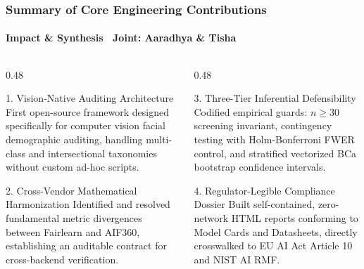 \begin{frame}
  \frametitle{Summary of Core Engineering Contributions}
  \framesubtitle{Impact \& Synthesis \textbar\ Joint: Aaradhya \& Tisha}

  \begin{columns}[T]
    \begin{column}{0.48\textwidth}
      \begin{card}{1. Vision-Native Auditing Architecture}
        \small First open-source framework designed specifically for computer vision facial demographic auditing, handling multi-class and intersectional taxonomies without custom ad-hoc scripts.
      \end{card}

      \vspace{0.15cm}
      \begin{card}{2. Cross-Vendor Mathematical Harmonization}
        \small Identified and resolved fundamental metric divergences between Fairlearn and AIF360, establishing an auditable contract for cross-backend verification.
      \end{card}
    \end{column}

    \begin{column}{0.48\textwidth}
      \begin{card}{3. Three-Tier Inferential Defensibility}
        \small Codified empirical guards: $n \ge 30$ screening invariant, contingency testing with Holm-Bonferroni FWER control, and stratified vectorized BCa bootstrap confidence intervals.
      \end{card}

      \vspace{0.15cm}
      \begin{card}{4. Regulator-Legible Compliance Dossier}
        \small Built self-contained, zero-network HTML reports conforming to Model Cards and Datasheets, directly crosswalked to EU AI Act Article 10 and NIST AI RMF.
      \end{card}
    \end{column}
  \end{columns}

  \vspace{0.25cm}
  \begin{center}
  \end{center}
\end{frame}
